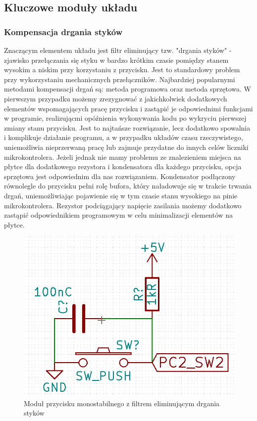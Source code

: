 \documentclass{article}
\begin{document}
	
\subsection{Kluczowe moduły układu}
\subsubsection{Kompensacja drgania styków}
Znaczącym elementem układu jest filtr eliminujący tzw. "drgania styków" - zjawisko przełączania się styku w bardzo krótkim czasie pomiędzy stanem wysokim a niskim przy korzystaniu z przycisku. Jest to standardowy problem przy wykorzystaniu mechanicznych przełączników. Najbardziej popularnymi metodami kompensacji drgań są: metoda programowa oraz metoda sprzętowa. W pierwszym przypadku możemy zrezygnować z jakichkolwiek dodatkowych elementów wspomagających pracę przycisku i zastąpić je odpowiednimi funkcjami w programie, realizującmi opóźnienia wykonywania kodu po wykryciu pierwszej zmiany stanu przycisku. Jest to najtańsze rozwiązanie, lecz dodatkowo spowalnia i komplikuje działanie programu, a w przypadku układów czasu rzeczywistego, uniemożliwia nieprzerwaną pracę lub zajmuje przydatne do innych celów liczniki mikrokontrolera. Jeżeli jednak nie mamy problemu ze znalezieniem miejsca na płytce dla dodatkowego rezystora i kondensatora dla każdego przycisku, opcja sprzętowa jest odpowiednim dla nas rozwiązaniem. Kondensator podłączony równolegle do przycisku pełni rolę bufora, który naładowuje się w trakcie trwania drgań, uniemożliwiając pojawienie się w tym czasie stanu wysokiego na pinie mikrokontrolera. Rezystor podciągający napięcie zasilania możemy dodatkowo zastąpić odpowiednikiem programowym w celu minimalizacji elementów na płytce. 

\begin{figure}[h!]
	\center
	\includegraphics[scale=0.3]{img/drgania_stykow.png}
	\caption{Moduł przycisku monostabilnego z filtrem eliminującym drgania styków}
	\label{fig:zdjecie2}
\end{figure}
\end{document}
